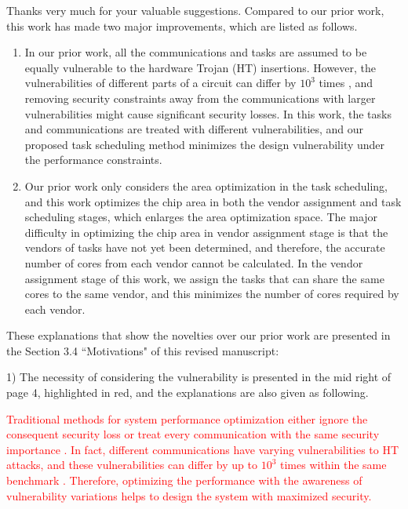 \documentclass[10pt,journal, compsoc]{IEEEtran}
\begin{document}
Thanks very much for your valuable suggestions. Compared to our prior work, this work has made two major improvements, which are listed as follows.
\begin{enumerate}
    \item In our prior work, all the communications and tasks are assumed to be equally vulnerable to the hardware Trojan (HT) insertions. However, the vulnerabilities of different parts of a circuit can differ by $10^3$ times \cite{conference:HS}, and removing security constraints away from the communications with larger vulnerabilities might cause significant security losses. In this work, the tasks and communications are treated with different vulnerabilities, and our proposed task scheduling method minimizes the design vulnerability under the performance constraints.
    \item Our prior work only considers the area optimization in the task scheduling, and this work optimizes the chip area in both the vendor assignment and task scheduling stages, which enlarges the area optimization space. The major difficulty in optimizing the chip area in vendor assignment stage is that the vendors of tasks have not yet been determined, and therefore, the accurate number of cores from each vendor cannot be calculated. In the vendor assignment stage of this work, we assign the tasks that can share the same cores to the same vendor, and this minimizes the number of cores required by each vendor.

\end{enumerate}

These explanations that show the novelties over our prior work are presented in the Section 3.4 ``Motivations" of this revised manuscript:

\vspace{0.5em}
1) The necessity of considering the vulnerability is presented in the mid right of page 4, highlighted in red, and the explanations are also given as following.

\textcolor{red}{Traditional methods for system performance optimization either ignore the consequent security loss \cite{article:CL} or treat every communication with the same security importance \cite{article:NW, conference:NW}. In fact, different communications have varying vulnerabilities to HT attacks, and these vulnerabilities can differ by up to $10^3$ times within the same benchmark \cite{conference:HS}. Therefore, optimizing the performance with the awareness of vulnerability variations helps to design the system with maximized security.}
\end{document}
